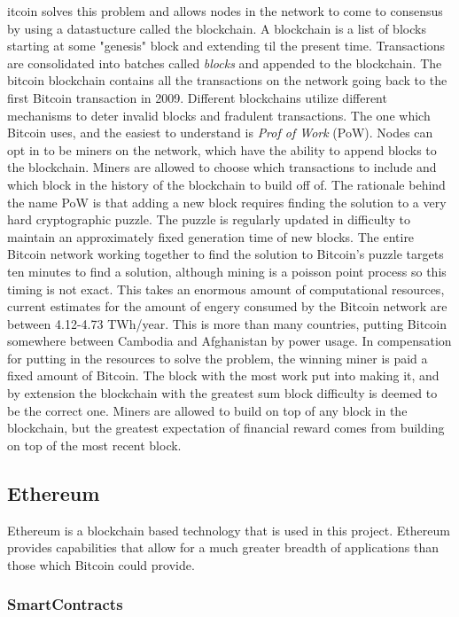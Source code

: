 \documentclass[a4paper]{article}
\begin{document}
itcoin solves this problem and allows nodes in the network to come to consensus by using a datastucture called the blockchain. A blockchain is a list of blocks starting at some "genesis" block and extending til the present time. Transactions are consolidated into batches called \textit{blocks} and appended to the blockchain. The bitcoin blockchain contains all the transactions on the network going back to the first Bitcoin transaction in 2009. Different blockchains utilize different mechanisms to deter invalid blocks and fradulent transactions. The one which Bitcoin uses, and the easiest to understand is \textit{Prof of Work} (PoW). Nodes can opt in to be miners on the network, which have the ability to append blocks to the blockchain. Miners are allowed to choose which transactions to include and which block in the history of the blockchain to build off of. The rationale behind the name PoW is that adding a new block requires finding the solution to a very hard cryptographic puzzle. The puzzle is regularly updated in difficulty to maintain an approximately fixed generation time of new blocks. The entire Bitcoin network working together to find the solution to Bitcoin's puzzle targets ten minutes to find a solution, although mining is a poisson point process so this timing is not exact. This takes an enormous amount of computational resources, current estimates for the amount of engery consumed by the Bitcoin network are between 4.12-4.73 TWh/year. This is more than many countries, putting Bitcoin somewhere between Cambodia and Afghanistan by power usage. In compensation for putting in the resources to solve the problem, the winning miner is paid a fixed amount of Bitcoin. The block with the most work put into making it, and by extension the blockchain with the greatest sum block difficulty is deemed to be the correct one. Miners are allowed to build on top of any block in the blockchain, but the greatest expectation of financial reward comes from building on top of the most recent block.

\subsection{Ethereum}

Ethereum is a blockchain based technology that is used in this project. Ethereum provides capabilities that allow for a much greater breadth of applications than those which Bitcoin could provide.

\subsubsection{SmartContracts}
\end{document}
